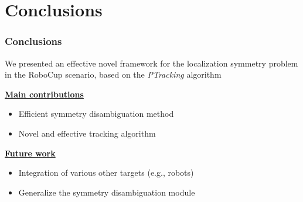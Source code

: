 \section{Conclusions}

\begin{frame}
	\frametitle{Conclusions}
	
	\Large
	
	\vspace{0.3cm}
	
	We presented an effective novel framework for the localization symmetry problem in the
	RoboCup scenario, based on the \emph{PTracking} algorithm
	
	\vspace{0.3cm}
	
	\underline{\textbf{Main contributions}}
	
	\begin{itemize}
		\item Efficient symmetry disambiguation method
		\item Novel and effective tracking algorithm
	\end{itemize}
	
	\vspace{0.2cm}
	
	\underline{\textbf{Future work}}
	
	\begin{itemize}
		\item Integration of various other targets (e.g., robots)
		\item Generalize the symmetry disambiguation module
	\end{itemize}
\end{frame}
